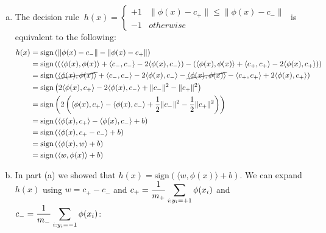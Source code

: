 \documentclass[twoside,11pt]{homework}
\DeclarePairedDelimiter{\2norm}{\lVert}{\rVert^2_2}
\newcommand{\1}[1]{\mathds{1}\left[#1\right]}
\begin{document}
\begin{enumerate}[\bf (i)]
\begin{enumerate}[(a)]
\item The decision rule $ \ h(x) = \begin{cases} +1 & \lVert\phi(x) - c_{+}\rVert \leq \lVert\phi(x) - c_{-}\rVert \\ -1 & otherwise \end{cases}$ is equivalent to the following:
\begin{align*}
h(x) & = \text{sign}\left( \lVert\phi(x) - c_{-}\rVert - \lVert\phi(x) - c_{+}\rVert \right) \\
& = \text{sign}\left( \left(\langle\phi(x), \phi(x)\rangle +  \langle c_{-}, c_{-} \rangle - 2\langle \phi(x), c_{-} \rangle\right) - \left(\langle\phi(x), \phi(x)\rangle +  \langle c_{+}, c_{+} \rangle - 2\langle \phi(x), c_{+} \rangle\right) \right) \\
& = \text{sign}\left( \cancel{\langle\phi(x), \phi(x)\rangle} +  \langle c_{-}, c_{-} \rangle - 2\langle \phi(x), c_{-} \rangle - \cancel{\langle\phi(x), \phi(x)\rangle} -  \langle c_{+}, c_{+} \rangle + 2\langle \phi(x), c_{+} \rangle \right)\\
& = \text{sign}\left( 2\langle \phi(x), c_{+} \rangle - 2\langle \phi(x), c_{-} \rangle +  \lVert c_{-} \rVert^2  -  \lVert c_{+}\rVert^2 \right) \\
& = \text{sign}\left( 2\left(\langle \phi(x), c_{+} \rangle - \langle \phi(x), c_{-} \rangle +  \frac{1}{2}\lVert c_{-} \rVert^2  -  \frac{1}{2}\lVert c_{+}\rVert^2 \right) \right) \\
& = \text{sign}\left(\langle \phi(x), c_{+} \rangle - \langle \phi(x), c_{-} \rangle +  b \right) \\
& = \text{sign}\left(\langle \phi(x), c_{+} - c_{-} \rangle  +  b \right) \\
& = \text{sign}\left(\langle \phi(x), w \rangle  +  b \right) \\
& = \text{sign}\left(\langle w, \phi(x) \rangle  +  b \right)
\end{align*}
\item In part (a) we showed that $h(x) = \text{sign}\left(\langle w, \phi(x) \rangle  +  b \right)$. We can expand $h(x)$ using $w = c_{+} - c_{-}$ and $\mathlarger{c_{+} = \frac{1}{m_+}\sum_{i:y_i = +1} \phi(x_i)}$ and $\mathlarger{c_{-} = \frac{1}{m_-}\sum_{i:y_i = -1} \phi(x_i)}$:


\end{enumerate}
\end{enumerate}
\end{document}
